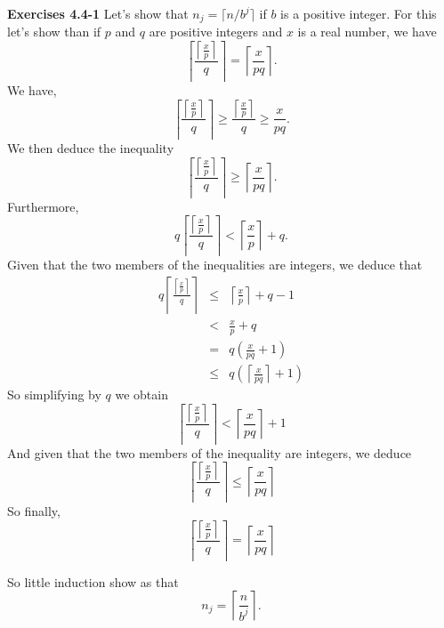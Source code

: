 \documentclass[a4paper,12pt]{article}
\newcommand{\newpar}[1]
{\bigskip \noindent \textbf{Exercises #1} \newline}
\begin{document}
\newpar{4.4-1}
Let's show that $n_j = \lceil n/b^j\rceil$ if $b$
is a positive integer.  For this let's show than if $p$ and $q$ are
positive integers and $x$ is a real number, we have
\[ \left\lceil
\frac{\left\lceil \frac{x}{p}\right\rceil} {q}
\right\rceil
= \left\lceil \frac{x}{pq}\right\rceil.\]
We have,
\[\left\lceil
\frac{\left\lceil\frac{x}{p}\right\rceil}{q}
\right\rceil \ge \frac{\left\lceil
  \frac{x}{p}\right\rceil}{q} \ge \frac{x}{pq}.
\]            
We then deduce the inequality
\[ \left\lceil
\frac{\left\lceil \frac{x}{p}\right\rceil} {q}
\right\rceil \ge \left\lceil
\frac{x}{pq}\right\rceil.
\]
Furthermore,
\[ q\left\lceil \frac{\left\lceil
  \frac{x}{p}\right\rceil}{q}\right\rceil  <
\left\lceil \frac{x}{p}\right\rceil + q.\]
Given that the two members of the inequalities are
integers, we deduce that
\begin{eqnarray*}
  q \left\lceil \frac{\left\lceil
    \frac{x}{p}\right\rceil}{q}
  \right\rceil &\le&
  \left\lceil \frac{x}{p}\right\rceil + q - 1 \\
  &<& \frac{x}{p} + q \\
  &=& q\left(\frac{x}{pq} + 1\right) \\
  &\le& q\left(
  \left\lceil\frac{x}{pq}\right\rceil + 1
  \right)
\end{eqnarray*}
So simplifying by $q$ we obtain
\[
\left\lceil \frac{\left\lceil
  \frac{x}{p}\right\rceil}{q}
\right\rceil
< \left\lceil\frac{x}{pq}\right\rceil + 1
\]
And given that the two members of the inequality are
integers, we deduce
\[
\left\lceil \frac{\left\lceil
  \frac{x}{p}\right\rceil}{q}
\right\rceil
\le \left\lceil\frac{x}{pq}\right\rceil
\]
So finally,
\[
\left\lceil \frac{\left\lceil
  \frac{x}{p}\right\rceil}{q}
\right\rceil
= \left\lceil\frac{x}{pq}\right\rceil
\]

So little induction show as that
\[ n_j = \left\lceil \frac{n}{b^j}\right\rceil.\]
\end{document}
